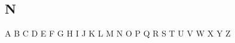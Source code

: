 \documentclass[11pt,twoside]{article}
\newcommand{\htmlref}[2]{#1}
\begin{document}
\subsection*{\label{index_N}N}

\begin{htmlonly}
\htmlref{A}{index_A}
\htmlref{B}{index_B}
\htmlref{C}{index_C}
\htmlref{D}{index_D}
\htmlref{E}{index_E}
\htmlref{F}{index_F}
\htmlref{G}{index_G}
\htmlref{H}{index_H}
\htmlref{I}{index_I}
\htmlref{J}{index_J}
\htmlref{K}{index_K}
\htmlref{L}{index_L}
\htmlref{M}{index_M}
N
\htmlref{O}{index_O}
\htmlref{P}{index_P}
\htmlref{Q}{index_Q}
\htmlref{R}{index_R}
\htmlref{S}{index_S}
\htmlref{T}{index_T}
\htmlref{U}{index_U}
\htmlref{V}{index_V}
\htmlref{W}{index_W}
\htmlref{X}{index_X}
\htmlref{Y}{index_Y}
Z
\end{htmlonly}
\end{document}
